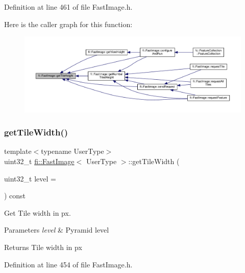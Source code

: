 Definition at line 461 of file Fast\+Image.\+h.

Here is the caller graph for this function\+:
\nopagebreak
\begin{figure}[H]
\begin{center}
\leavevmode
\includegraphics[width=350pt]{dc/d6b/classfi_1_1FastImage_ae9f67a164a2e42f7c80b8443080e876b_icgraph}
\end{center}
\end{figure}
\mbox{\label{classfi_1_1FastImage_a4544e690ce41bfc0b4ca4e94f5ecd2b1}} 
\subsubsection{\texorpdfstring{get\+Tile\+Width()}{getTileWidth()}}
{\footnotesize\ttfamily template$<$typename User\+Type$>$ \\
uint32\+\_\+t \hyperlink{classfi_1_1FastImage}{fi\+::\+Fast\+Image}$<$ User\+Type $>$\+::get\+Tile\+Width (\begin{DoxyParamCaption}\item[{uint32\+\_\+t}]{level = {} }\end{DoxyParamCaption}) const\hspace{0.3cm}{\ttfamily [inline]}}



Get Tile width in px. 


\begin{DoxyParams}{Parameters}
{\em level} & Pyramid level \\
\hline
\end{DoxyParams}
\begin{DoxyReturn}{Returns}
Tile width in px 
\end{DoxyReturn}


Definition at line 454 of file Fast\+Image.\+h.

